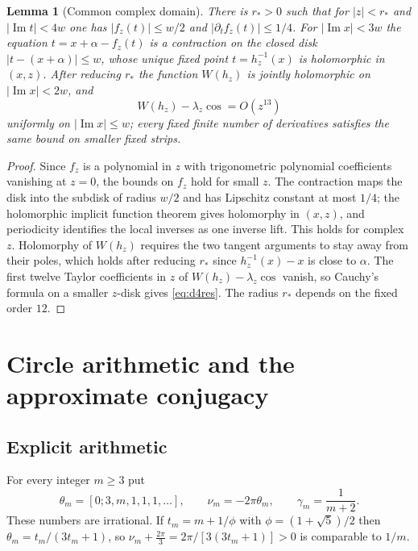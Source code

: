\documentclass[11pt]{amsart}
\numberwithin{equation}{section}
\newtheorem{lemma}[theorem]{Lemma}
\theoremstyle{definition}
\theoremstyle{remark}
\newcommand{\abs}[1]{\lvert #1\rvert}
\begin{document}
\begin{lemma}[Common complex domain]\label{lem:d4domain}
There is $r_*>0$ such that for $\abs z<r_*$ and $\abs{\operatorname{Im}t}<4w$ one has $\abs{f_z(t)}\le w/2$ and $\abs{\partial_tf_z(t)}\le1/4$. For $\abs{\operatorname{Im}x}<3w$ the equation $t=x+\alpha-f_z(t)$ is a contraction on the closed disk $\abs{t-(x+\alpha)}\le w$, whose unique fixed point $t=h_z^{-1}(x)$ is holomorphic in $(x,z)$. After reducing $r_*$ the function $W(h_z)$ is jointly holomorphic on $\abs{\operatorname{Im}x}<2w$, and
\begin{equation}\label{eq:d4res}
W(h_z)-\lambda_z\cos=O(z^{13})
\end{equation}
uniformly on $\abs{\operatorname{Im}x}\le w$; every fixed finite number of derivatives satisfies the same bound on smaller fixed strips.
\end{lemma}

\begin{proof}
Since $f_z$ is a polynomial in $z$ with trigonometric polynomial coefficients vanishing at $z=0$, the bounds on $f_z$ hold for small $z$. The contraction maps the disk into the subdisk of radius $w/2$ and has Lipschitz constant at most $1/4$; the holomorphic implicit function theorem gives holomorphy in $(x,z)$, and periodicity identifies the local inverses as one inverse lift. This holds for complex $z$. Holomorphy of $W(h_z)$ requires the two tangent arguments to stay away from their poles, which holds after reducing $r_*$ since $h_z^{-1}(x)-x$ is close to $\alpha$. The first twelve Taylor coefficients in $z$ of $W(h_z)-\lambda_z\cos$ vanish, so Cauchy's formula on a smaller $z$-disk gives \eqref{eq:d4res}. The radius $r_*$ depends on the fixed order $12$.
\end{proof}

\section{Circle arithmetic and the approximate conjugacy}\label{sec:d4conj}

\subsection{Explicit arithmetic}
For every integer $m\ge3$ put
\begin{equation}\label{eq:thetam}
\theta_m=[0;3,m,1,1,1,\dots],\qquad \nu_m=-2\pi\theta_m,\qquad \gamma_m=\frac1{m+2}.
\end{equation}
These numbers are irrational. If $t_m=m+1/\phi$ with $\phi=(1+\sqrt5)/2$ then $\theta_m=t_m/(3t_m+1)$, so $\nu_m+\frac{2\pi}3=2\pi/[3(3t_m+1)]>0$ is comparable to $1/m$.
\end{document}
